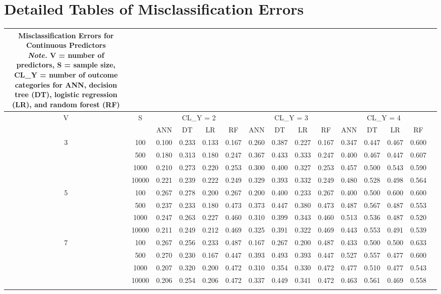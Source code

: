 \documentclass[12pt]{article}
\begin{document}
\newpage

\appendix
\section{Detailed Tables of Misclassification Errors}
\label{app:misclass_errors}

{\small
\setlength{\tabcolsep}{3pt}
\renewcommand{\arraystretch}{1}
\begin{longtable}{ccccccccccccccc}
    \caption{\normalsize{Misclassification Errors for Continuous Predictors \\
         \textit{Note.} V = number of predictors, S = sample size, CL\_Y = number of outcome categories for ANN, decision tree (DT), logistic regression (LR), and random forest (RF)}} \\
    \hline
    V & S & \multicolumn{4}{c}{CL\_Y = 2} & \multicolumn{4}{c}{CL\_Y = 3} & \multicolumn{4}{c}{CL\_Y = 4} \\
    \cline{3-14}
    & & ANN & DT & LR & RF & ANN & DT & LR & RF & ANN & DT & LR & RF \\
    \hline
    3 & 100 & 0.100 & 0.233 & 0.133 & 0.167 & 0.260 & 0.387 & 0.227 & 0.167 & 0.347 & 0.447 & 0.467 & 0.600 \\
      & 500 & 0.180 & 0.313 & 0.180 & 0.247 & 0.367 & 0.433 & 0.333 & 0.247 & 0.400 & 0.467 & 0.447 & 0.607 \\
      & 1000 & 0.210 & 0.273 & 0.220 & 0.253 & 0.300 & 0.400 & 0.327 & 0.253 & 0.457 & 0.500 & 0.543 & 0.590 \\
      & 10000 & 0.221 & 0.239 & 0.222 & 0.249 & 0.329 & 0.393 & 0.332 & 0.249 & 0.480 & 0.528 & 0.498 & 0.564 \\
    \hline
    5 & 100 & 0.267 & 0.278 & 0.200 & 0.267 & 0.200 & 0.400 & 0.233 & 0.267 & 0.400 & 0.500 & 0.600 & 0.600 \\
      & 500 & 0.237 & 0.233 & 0.180 & 0.473 & 0.373 & 0.447 & 0.380 & 0.473 & 0.487 & 0.567 & 0.487 & 0.553 \\
      & 1000 & 0.247 & 0.263 & 0.227 & 0.460 & 0.310 & 0.399 & 0.343 & 0.460 & 0.513 & 0.536 & 0.487 & 0.520 \\
      & 10000 & 0.211 & 0.249 & 0.212 & 0.469 & 0.325 & 0.391 & 0.322 & 0.469 & 0.443 & 0.553 & 0.491 & 0.539 \\
    \hline
    7 & 100 & 0.267 & 0.256 & 0.233 & 0.487 & 0.167 & 0.267 & 0.200 & 0.487 & 0.433 & 0.500 & 0.500 & 0.633 \\
      & 500 & 0.270 & 0.230 & 0.167 & 0.447 & 0.393 & 0.493 & 0.393 & 0.447 & 0.527 & 0.557 & 0.477 & 0.600 \\
      & 1000 & 0.207 & 0.320 & 0.200 & 0.472 & 0.310 & 0.354 & 0.330 & 0.472 & 0.477 & 0.510 & 0.477 & 0.543 \\
      & 10000 & 0.206 & 0.254 & 0.206 & 0.472 & 0.337 & 0.449 & 0.341 & 0.472 & 0.463 & 0.561 & 0.469 & 0.558 \\
    \hline
    \label{tab:misclassification_errors}
\end{longtable}
}
\end{document}
